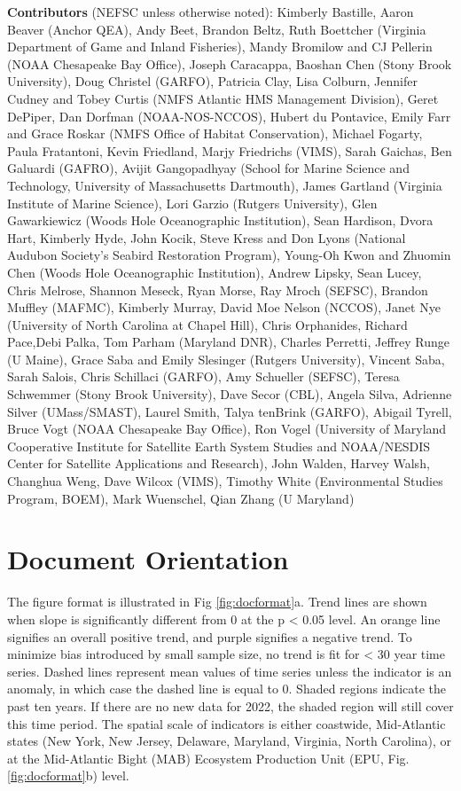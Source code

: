 \documentclass[
  10pt,
]{article}
\begin{document}
\textbf{Contributors} (NEFSC unless otherwise noted): Kimberly Bastille, Aaron Beaver (Anchor QEA), Andy Beet, Brandon Beltz, Ruth Boettcher (Virginia Department of Game and Inland Fisheries), Mandy Bromilow and CJ Pellerin (NOAA Chesapeake Bay Office), Joseph Caracappa, Baoshan Chen (Stony Brook University), Doug Christel (GARFO), Patricia Clay, Lisa Colburn, Jennifer Cudney and Tobey Curtis (NMFS Atlantic HMS Management Division), Geret DePiper, Dan Dorfman (NOAA-NOS-NCCOS), Hubert du Pontavice, Emily Farr and Grace Roskar (NMFS Office of Habitat Conservation), Michael Fogarty, Paula Fratantoni, Kevin Friedland, Marjy Friedrichs (VIMS), Sarah Gaichas, Ben Galuardi (GAFRO), Avijit Gangopadhyay (School for Marine Science and Technology, University of Massachusetts Dartmouth), James Gartland (Virginia Institute of Marine Science), Lori Garzio (Rutgers University), Glen Gawarkiewicz (Woods Hole Oceanographic Institution), Sean Hardison, Dvora Hart, Kimberly Hyde, John Kocik, Steve Kress and Don Lyons (National Audubon Society's Seabird Restoration Program), Young-Oh Kwon and Zhuomin Chen (Woods Hole Oceanographic Institution), Andrew Lipsky, Sean Lucey, Chris Melrose, Shannon Meseck, Ryan Morse, Ray Mroch (SEFSC), Brandon Muffley (MAFMC), Kimberly Murray, David Moe Nelson (NCCOS), Janet Nye (University of North Carolina at Chapel Hill), Chris Orphanides, Richard Pace,Debi Palka, Tom Parham (Maryland DNR), Charles Perretti, Jeffrey Runge (U Maine), Grace Saba and Emily Slesinger (Rutgers University), Vincent Saba, Sarah Salois, Chris Schillaci (GARFO), Amy Schueller (SEFSC), Teresa Schwemmer (Stony Brook University), Dave Secor (CBL), Angela Silva, Adrienne Silver (UMass/SMAST), Laurel Smith, Talya tenBrink (GARFO), Abigail Tyrell, Bruce Vogt (NOAA Chesapeake Bay Office), Ron Vogel (University of Maryland Cooperative Institute for Satellite Earth System Studies and NOAA/NESDIS Center for Satellite Applications and Research), John Walden, Harvey Walsh, Changhua Weng, Dave Wilcox (VIMS), Timothy White (Environmental Studies Program, BOEM), Mark Wuenschel, Qian Zhang (U Maryland)

\hypertarget{document-orientation}{%
\section{Document Orientation}\label{document-orientation}}

The figure format is illustrated in Fig \ref{fig:docformat}a. Trend lines are shown when slope is significantly different from 0 at the p \textless{} 0.05 level. An orange line signifies an overall positive trend, and purple signifies a negative trend. To minimize bias introduced by small sample size, no trend is fit for \textless{} 30 year time series. Dashed lines represent mean values of time series unless the indicator is an anomaly, in which case the dashed line is equal to 0. Shaded regions indicate the past ten years. If there are no new data for 2022, the shaded region will still cover this time period. The spatial scale of indicators is either coastwide, Mid-Atlantic states (New York, New Jersey, Delaware, Maryland, Virginia, North Carolina), or at the Mid-Atlantic Bight (MAB) Ecosystem Production Unit (EPU, Fig. \ref{fig:docformat}b) level.
\end{document}
